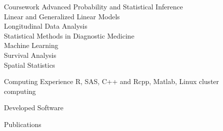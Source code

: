 \documentclass{resume} %
\begin{document}
\begin{rSection}{Coursework}
Advanced Probability and Statistical Inference\\
Linear and Generalized Linear Models\\
Longitudinal Data Analysis\\
Statistical Methods in Diagnostic Medicine\\
Machine Learning\\
Survival Analysis\\
Spatial Statistics
\end{rSection}


\begin{rSection}{Computing Experience}
R, SAS, C++ and Rcpp, Matlab, Linux cluster computing

\end{rSection}


\begin{rSection}{Developed Software}

\begin{refsection}
\nocite{*}
\leavevmode\printbibliography[omitnumbers=true,heading=none]
\end{refsection}

\end{rSection}

\begin{rSection}{Publications}

\begin{refsection}[CV.bib]
\nocite{*}
\printbibliography[keyword=Published,omitnumbers=true,title=Published]
\printbibliography[keyword=Accepted,omitnumbers=true,title=Accepted]
\printbibliography[keyword=Submitted,omitnumbers=true,title=Submitted]
\end{refsection}

\end{rSection}
\end{document}
